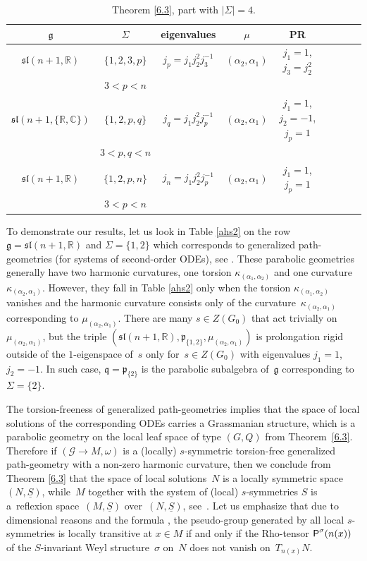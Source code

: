 \documentclass[10pt,a4paper]{amsart}
\newcommand{\om}{\omega}
\newcommand{\si}{\sigma}
\newcommand{\Si}{\Sigma}
\newcommand{\un}{\underline}
\newcommand{\ba}{\mathcal{G}}
\newcommand{\fg}{\mathfrak g}
\newcommand{\fv}{\mathfrak q}
\newcommand{\fp}{\mathfrak p}
\newcommand{\Rho}{{\mbox{\sf P}}}
\newcommand{\R}{\mathbb{R}}
\newcommand{\C}{\mathbb{C}}
\numberwithin{equation}{section}
\begin{document}
\begin{table}[th!]\centering\caption{Theorem \ref{6.3}, part with $|\Si|=4$.}\label{ahs4}\vspace{1mm}
\begin{tabular}{|c|c|c|c|c|c|c|c|c|}
\hline
$\fg$ & $\Sigma$ & eigenvalues& $\mu$& PR \\
\hline
\hline
$\mathfrak{sl}(n+1,\mathbb{R})$ & $\{1,2,3,p\}$ &$j_p=j_1j_2^2j_3^{-1}$&$(\alpha_2,\alpha_1)$& $j_1=1$, $j_3=j_2^2$\\
& $3<p<n$& & &\\
\hline
$\mathfrak{sl}(n+1,\{\mathbb{R},\C\})$ & $\{1,2,p,q\}$&$j_q=j_1j_2^2j_p^{-1}$&$(\alpha_2,\alpha_1)$& $j_1=1$, $j_2=-1$, $j_p=1$\\
& $3<p,q<n$& & &\\
\hline
$\mathfrak{sl}(n+1,\mathbb{R})$ & $\{1,2,p,n\}$&$j_n=j_1j_2^2j_p^{-1}$&$(\alpha_2,\alpha_1)$& $j_1=1$, $j_p=1$\\
& $3<p<n$& & &\\
\hline
\end{tabular}
\end{table}

\begin{Example}\label{expg}To demonstrate our results, let us look in Table \ref{ahs2} on the row $\fg=\mathfrak{sl}(n+1,\R)$ and $\Sigma=\{1,2\}$ which corresponds to generalized path-geometries (for systems of second-order ODEs), see \cite[Sections 4.4.3--4.4.5]{parabook}. These parabolic geometries generally have two harmonic curvatures, one torsion $\kappa_{(\alpha_1,\alpha_2)}$ and one curvature $\kappa_{(\alpha_2,\alpha_1)}$. However, they fall in Table \ref{ahs2} only when the torsion $\kappa_{(\alpha_1,\alpha_2)}$ vanishes and the harmonic curvature consists only of the curva\-tu\-re~$\kappa_{(\alpha_2,\alpha_1)}$ corresponding to $\mu_{(\alpha_2,\alpha_1)}$. There are many $s\in Z(G_0)$ that act trivially on $\mu_{(\alpha_2,\alpha_1)}$, but the triple $(\mathfrak{sl}(n+1,\R),\fp_{\{1,2\}},\mu_{(\alpha_2,\alpha_1)})$ is prolongation rigid outside of the $1$-eigenspace of~$s$ only for~$s\in Z(G_0)$ with eigenvalues $j_1=1$, $j_2=-1$. In such case, $\fv=\fp_{\{2\}}$ is the parabolic subalgebra of~$\fg$ corresponding to $\Sigma=\{2\}$.

The torsion-freeness of generalized path-geometries implies that the space of local solutions of the corresponding ODEs carries a Grassmanian structure, which is a parabolic geometry on the local leaf space of type $(G,Q)$ from Theorem~\ref{6.3}.
Therefore if $(\ba\to M,\om)$ is a (locally) $s$-symmetric torsion-free generalized path-geometry with a non-zero harmonic curvature, then we conclude from Theorem \ref{6.3} that the space of local solutions~$N$ is a locally symmetric space~$(N,\un S)$, while~$M$ together with the system of (local) $s$-symmetries $S$ is a~ref\/lexion space~$(M,\un S)$ over~$(N,\un S)$, see~\cite{G1}. Let us emphasize that due to dimensional reasons and the formula \cite[Theorem~5.2.9]{parabook}, the pseudo-group generated by all local $s$-symmetries is locally transitive at $x\in M$ if and only if the Rho-tensor $\Rho^\si(n(x))$ of the $S$-invariant Weyl structure~$\si$ on~$N$ does not vanish on~$T_{n(x)}N$.
\end{Example}
\end{document}
